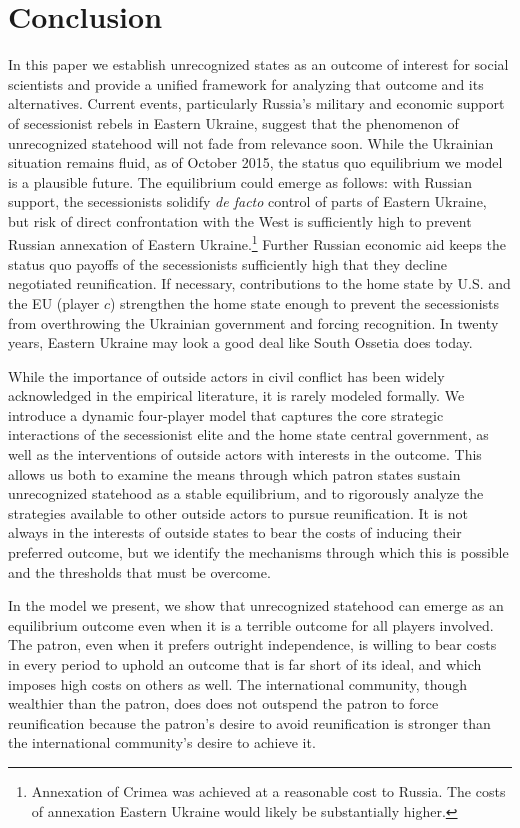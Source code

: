 \documentclass[11pt,letterpaper, notitlepage]{article}
\begin{document}
\section{Conclusion}
In this paper we establish unrecognized states as an outcome of interest for social scientists and provide a unified framework for analyzing that outcome and its alternatives. Current events, particularly Russia's military and economic support of secessionist rebels in Eastern Ukraine, suggest that the phenomenon of unrecognized statehood will not fade from relevance soon. While the Ukrainian situation remains fluid, as of October 2015, the status quo equilibrium we model is a plausible future. The equilibrium could emerge as follows: with Russian support, the secessionists solidify \emph{de facto} control of parts of Eastern Ukraine, but risk of direct confrontation with the West is sufficiently high to prevent Russian annexation of Eastern Ukraine.\footnote{Annexation of Crimea was achieved at a reasonable cost to Russia. The costs of annexation Eastern Ukraine would likely be substantially higher.} Further Russian economic aid keeps the status quo payoffs of the secessionists sufficiently high that they decline negotiated reunification. If necessary, contributions to the home state by U.S. and the EU (player $c$) strengthen the home state enough to prevent the secessionists from overthrowing the Ukrainian government and forcing recognition. In twenty years, Eastern Ukraine may look a good deal like South Ossetia does today. 

While the importance of outside actors in civil conflict has been widely acknowledged in the empirical literature, it is rarely modeled formally. We introduce a dynamic four-player model that captures the core strategic interactions of the secessionist elite and the home state central government, as well as the interventions of outside actors with interests in the outcome. This allows us both to examine the means through which patron states sustain unrecognized statehood as a stable equilibrium, and to rigorously analyze the strategies available to other outside actors to pursue reunification. It is not always in the interests of outside states to bear the costs of inducing their preferred outcome, but we identify the mechanisms through which this is possible and the thresholds that must be overcome.

In the model we present, we show that unrecognized statehood can emerge as an equilibrium outcome even when it is a terrible outcome for all players involved. The patron, even when it prefers outright independence, is willing to bear costs in every period to uphold an outcome that is far short of its ideal, and which imposes high costs on others as well. The international community, though wealthier than the patron, does does not outspend the patron to force reunification because the patron's desire to avoid reunification is stronger than the international community's desire to achieve it.  
\end{document}
